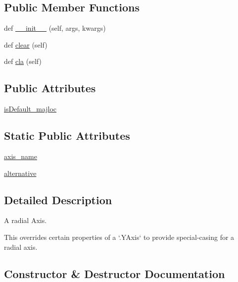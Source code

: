 \subsection*{Public Member Functions}
\begin{DoxyCompactItemize}
\item 
def \hyperlink{classmatplotlib_1_1projections_1_1polar_1_1RadialAxis_a6876619d95fc7763a23e6592e6f2aa2b}{\+\_\+\+\_\+init\+\_\+\+\_\+} (self, args, kwargs)
\item 
def \hyperlink{classmatplotlib_1_1projections_1_1polar_1_1RadialAxis_a77566a6bfc12bf93f36ca583010ade4a}{clear} (self)
\item 
def \hyperlink{classmatplotlib_1_1projections_1_1polar_1_1RadialAxis_a0529f34d9429e390f257264d861fb1dd}{cla} (self)
\end{DoxyCompactItemize}
\subsection*{Public Attributes}
\begin{DoxyCompactItemize}
\item 
\hyperlink{classmatplotlib_1_1projections_1_1polar_1_1RadialAxis_a003646a65d1da01a53623f759c575950}{is\+Default\+\_\+majloc}
\end{DoxyCompactItemize}
\subsection*{Static Public Attributes}
\begin{DoxyCompactItemize}
\item 
\hyperlink{classmatplotlib_1_1projections_1_1polar_1_1RadialAxis_abbcb199f253005b0684bdd5ea9498589}{axis\+\_\+name}
\item 
\hyperlink{classmatplotlib_1_1projections_1_1polar_1_1RadialAxis_a9a88eb14aeef0f582d8deb360235dcc4}{alternative}
\end{DoxyCompactItemize}


\subsection{Detailed Description}
\begin{DoxyVerb}A radial Axis.

This overrides certain properties of a `.YAxis` to provide special-casing
for a radial axis.
\end{DoxyVerb}
 

\subsection{Constructor \& Destructor Documentation}
\mbox{\label{classmatplotlib_1_1projections_1_1polar_1_1RadialAxis_a6876619d95fc7763a23e6592e6f2aa2b}} 
